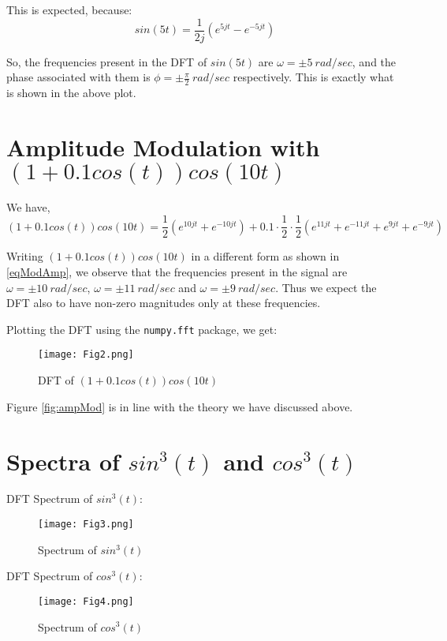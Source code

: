 \documentclass[11pt, a4paper, twoside]{article}
\begin{document}
    This is expected, because:
    \begin{equation}
        sin(5t) = \frac{1}{2j}(e^{5jt}-e^{-5jt})
    \end{equation}
    
    So, the frequencies present in the DFT of $sin(5t)$ are $\omega = \pm5\ rad/sec$, and the phase associated with them is $\phi = \pm \frac{\pi}{2}\ rad/sec$ respectively. This is exactly what is shown in the above plot.

\section{Amplitude Modulation with $(1+0.1cos(t))cos(10t)$}
    We have,
    \begin{equation}
        (1+0.1cos(t))cos(10t) = \frac{1}{2}(e^{10jt}+e^{-10jt}) + 0.1\cdot\frac{1}{2}\cdot\frac{1}{2}(e^{11jt} + e^{-11jt} + e^{9jt} + e^{-9jt})
        \label{eqModAmp}
    \end{equation}
    
    Writing $(1+0.1cos(t))cos(10t)$ in a different form as shown in \eqref{eqModAmp}, we observe that the frequencies present in the signal are $\omega = \pm 10\ rad/sec$, $\omega = \pm 11\ rad/sec$ and $\omega = \pm 9\ rad/sec$. Thus we expect the DFT also to have non-zero magnitudes only at these frequencies.
    
    Plotting the DFT using the \texttt{numpy.fft} package, we get:
    \begin{figure}[H]
        \centering
        \texttt{[image: Fig2.png]}
        \caption{DFT of $(1+0.1cos(t))cos(10t)$}
        \label{fig:ampMod}
    \end{figure}
    
    Figure \eqref{fig:ampMod} is in line with the theory we have discussed above.

\section{Spectra of $sin^3(t)$ and $cos^3(t)$}
DFT Spectrum of $sin^3(t)$:
\begin{figure}[H]
    \centering
    \texttt{[image: Fig3.png]}
    \caption{Spectrum of $sin^3(t)$}
    \label{fig:sin^3t}
\end{figure}

DFT Spectrum of $cos^3(t)$:
\begin{figure}[H]
    \centering
    \texttt{[image: Fig4.png]}
    \caption{Spectrum of $cos^3(t)$}
    \label{fig:cos^3t}
\end{figure}
\end{document}
